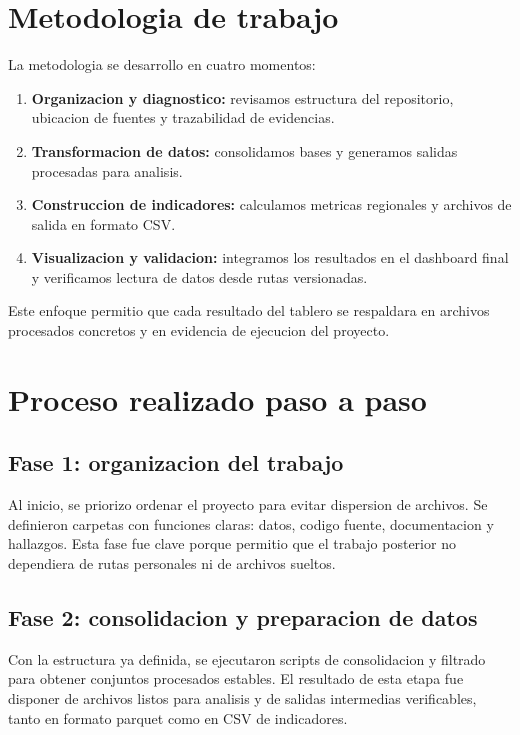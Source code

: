 \documentclass[12pt,letterpaper]{article}
\begin{document}
\section{Metodologia de trabajo}

La metodologia se desarrollo en cuatro momentos:

\begin{enumerate}[label=\arabic*.]
  \item \textbf{Organizacion y diagnostico:} revisamos estructura del repositorio, ubicacion de fuentes y trazabilidad de evidencias.
  \item \textbf{Transformacion de datos:} consolidamos bases y generamos salidas procesadas para analisis.
  \item \textbf{Construccion de indicadores:} calculamos metricas regionales y archivos de salida en formato CSV.
  \item \textbf{Visualizacion y validacion:} integramos los resultados en el dashboard final y verificamos lectura de datos desde rutas versionadas.
\end{enumerate}

Este enfoque permitio que cada resultado del tablero se respaldara en archivos procesados concretos y en evidencia de ejecucion del proyecto.

\section{Proceso realizado paso a paso}

\subsection{Fase 1: organizacion del trabajo}

Al inicio, se priorizo ordenar el proyecto para evitar dispersion de archivos. Se definieron carpetas con funciones claras: datos, codigo fuente, documentacion y hallazgos. Esta fase fue clave porque permitio que el trabajo posterior no dependiera de rutas personales ni de archivos sueltos.

\subsection{Fase 2: consolidacion y preparacion de datos}

Con la estructura ya definida, se ejecutaron scripts de consolidacion y filtrado para obtener conjuntos procesados estables. El resultado de esta etapa fue disponer de archivos listos para analisis y de salidas intermedias verificables, tanto en formato parquet como en CSV de indicadores.
\end{document}
